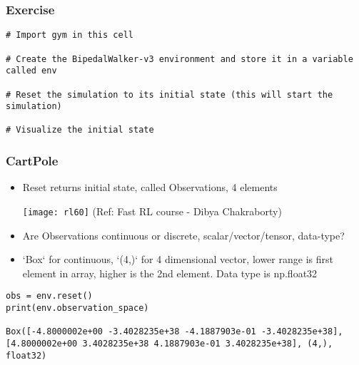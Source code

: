 \begin{frame}[fragile]\frametitle{Exercise}


\begin{lstlisting}
# Import gym in this cell

# Create the BipedalWalker-v3 environment and store it in a variable called env

# Reset the simulation to its initial state (this will start the simulation)

# Visualize the initial state
\end{lstlisting}

\end{frame}

\begin{frame}[fragile]\frametitle{CartPole}

\begin{itemize}
\item Reset returns initial state, called Observations, 4 elements

\begin{center}
\texttt{[image: rl60]}
{\tiny (Ref: Fast RL course - Dibya Chakraborty)}
\end{center}

\item Are Observations continuous or discrete, scalar/vector/tensor, data-type?
\item `Box` for continuous, `(4,)` for 4 dimensional vector, lower range is first element in array, higher is the 2nd element. Data type is np.float32
\end{itemize}

\begin{lstlisting}
obs = env.reset() 
print(env.observation_space)

Box([-4.8000002e+00 -3.4028235e+38 -4.1887903e-01 -3.4028235e+38], [4.8000002e+00 3.4028235e+38 4.1887903e-01 3.4028235e+38], (4,), float32)
\end{lstlisting}


\end{frame}

